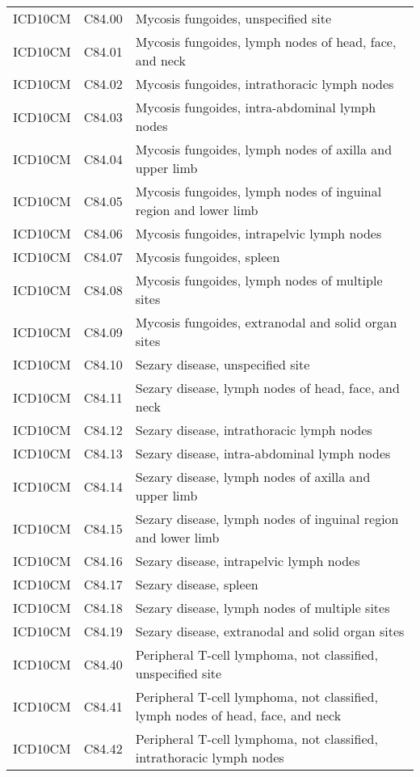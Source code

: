 \begin{longtable}{p{}p{}p{}}
  ICD10CM & C84.00 & Mycosis fungoides, unspecified site \\ 
  ICD10CM & C84.01 & Mycosis fungoides, lymph nodes of head, face, and neck \\ 
  ICD10CM & C84.02 & Mycosis fungoides, intrathoracic lymph nodes \\ 
  ICD10CM & C84.03 & Mycosis fungoides, intra-abdominal lymph nodes \\ 
  ICD10CM & C84.04 & Mycosis fungoides, lymph nodes of axilla and upper limb \\ 
  ICD10CM & C84.05 & Mycosis fungoides, lymph nodes of inguinal region and lower limb \\ 
  ICD10CM & C84.06 & Mycosis fungoides, intrapelvic lymph nodes \\ 
  ICD10CM & C84.07 & Mycosis fungoides, spleen \\ 
  ICD10CM & C84.08 & Mycosis fungoides, lymph nodes of multiple sites \\ 
  ICD10CM & C84.09 & Mycosis fungoides, extranodal and solid organ sites \\ 
  ICD10CM & C84.10 & Sezary disease, unspecified site \\ 
  ICD10CM & C84.11 & Sezary disease, lymph nodes of head, face, and neck \\ 
  ICD10CM & C84.12 & Sezary disease, intrathoracic lymph nodes \\ 
  ICD10CM & C84.13 & Sezary disease, intra-abdominal lymph nodes \\ 
  ICD10CM & C84.14 & Sezary disease, lymph nodes of axilla and upper limb \\ 
  ICD10CM & C84.15 & Sezary disease, lymph nodes of inguinal region and lower limb \\ 
  ICD10CM & C84.16 & Sezary disease, intrapelvic lymph nodes \\ 
  ICD10CM & C84.17 & Sezary disease, spleen \\ 
  ICD10CM & C84.18 & Sezary disease, lymph nodes of multiple sites \\ 
  ICD10CM & C84.19 & Sezary disease, extranodal and solid organ sites \\ 
  ICD10CM & C84.40 & Peripheral T-cell lymphoma, not classified, unspecified site \\ 
  ICD10CM & C84.41 & Peripheral T-cell lymphoma, not classified, lymph nodes of head, face, and neck \\ 
  ICD10CM & C84.42 & Peripheral T-cell lymphoma, not classified, intrathoracic lymph nodes \\ 

\end{longtable}
